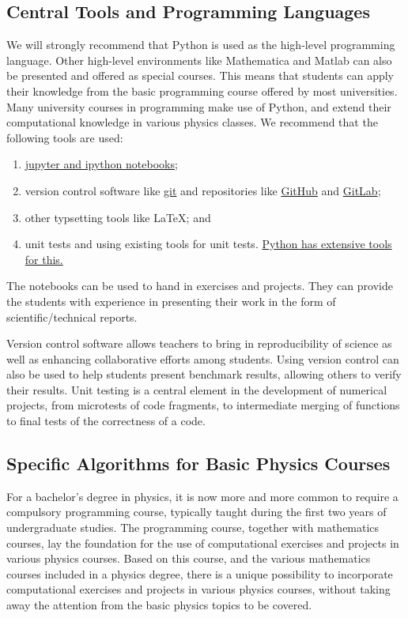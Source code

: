 \documentclass[graybox,envcountchap,sectrefs]{svmult}
\begin{document}
\subsection{Central Tools and Programming Languages}
We will strongly recommend that Python is used as the high-level
 programming language. Other high-level environments like Mathematica
 and Matlab can also be presented and offered as special courses. This
 means that students can apply their knowledge from the basic programming course offered by most universities.
Many university courses in programming  make use of Python, and extend their computational knowledge in
 various physics classes. We recommend  that the following
 tools are used:
\begin{enumerate}
\item \href{{http://jupyter.org/}}{jupyter and ipython notebooks};

\item version control software like \href{{https://git-scm.com/}}{git} and repositories like \href{{https://github.com/}}{GitHub} and \href{{https://gitlab.com/}}{GitLab};

\item other typsetting tools like {\LaTeX}; and

\item unit tests and using existing tools for unit tests. \href{{https://docs.python.org/2/library/unittest.html}}{Python has extensive tools for this.}
\end{enumerate}


The notebooks can be used to hand in exercises and projects. They can
provide the students with experience in presenting their work in the
form of scientific/technical reports.

Version control software allows teachers to bring in reproducibility
of science as well as enhancing collaborative efforts among
students. Using version control can also be used to help students
present benchmark results, allowing others to verify their
results. Unit testing is a central element in the development of
numerical projects, from microtests of code fragments, to intermediate
merging of functions to final tests of the correctness of a code.

\subsection{Specific Algorithms for Basic Physics Courses}

For a bachelor's degree in physics, it is now more and more common to require a compulsory
programming course, typically taught during the first two years of
undergraduate studies. The programming course, together with
mathematics courses, lay the foundation for the use of computational
exercises and projects in various physics courses. Based on this
course, and the various mathematics courses included in a physics
degree, there is a unique possibility to incorporate computational
exercises and projects in various physics courses, without taking away
the attention from the basic physics topics to be covered.
\end{document}
